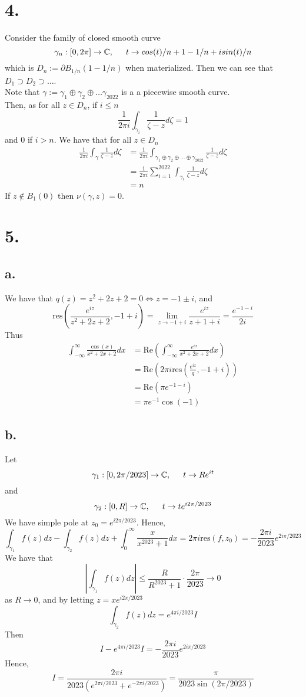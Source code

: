 \documentclass[11pt]{article}
\begin{document}
\section*{4.}
Consider the family of closed smooth curve
\[
    \gamma_n: [0,2\pi] \to \mathbb{C}, \indent t \to cos(t)/n + 1 - 1/n + isin(t)/n
\]
which is $D_n := \partial B_{1/n}(1-1/n)$ when materialized. Then we can see that $D_1 \supset D_2 \supset \hdots$. \\
Note that $\gamma := \gamma_1 \oplus \gamma_2 \oplus \hdots \gamma_{2022}$ is a a piecewise smooth curve.  \\
Then, as for all $z \in D_n$, if $i\le n$
\[
    \frac{1}{2\pi i}\int_{\gamma_i} \frac{1}{\zeta - z} d\zeta = 1 
\]
and $0$ if $i > n$. We have that for all $z \in D_n$
\begin{align*}
    \frac{1}{2\pi i}\int_\gamma \frac{1}{\zeta - z} d\zeta 
    &= \frac{1}{2\pi i}\int_{\gamma_1 \oplus \gamma_2 \oplus \hdots \oplus \gamma_{2022}} \frac{1}{\zeta - z} d\zeta \\
    &= \frac{1}{2\pi i}\sum_{i = 1}^{2022} \int_{\gamma_i} \frac{1}{\zeta - z} d\zeta \\
    &= n
\end{align*}
If $z \notin B_1(0)$ then $\nu(\gamma, z) = 0$. 
\newpage
\section*{5.}
\subsection*{a.}
We have that $q(z) = z^2 + 2z +2 = 0 \iff z = -1 \pm i$, and 
\[
    \text{res}\left(\frac{e^{iz}}{z^2+2z+2}, -1 + i\right) = \lim_{z \to -1+i} \frac{e^{iz}}{z+1+i} = \frac{e^{-1-i}}{2i}
\]
Thus 
\begin{align*}
    \int_{-\infty}^\infty \frac{\cos(x)}{x^2+2x+2} dx 
    &= \text{Re}\left( \int_{-\infty}^\infty \frac{e^{ix}}{x^2+2x+2} dx \right) \\
    &= \text{Re}\left(2\pi i \text{res}\left( \frac{e^{iz}}{q}, -1+i \right) \right)\\
    &= \text{Re}(\pi e^{-1-i}) \\
    &= \pi e^{-1}\cos(-1)
\end{align*}
\subsection*{b.}
Let 
\[
    \gamma_1: [0,2\pi/2023] \to \mathbb{C}, \indent t \to Re^{it}
\]
and 
\[
    \gamma_2: [0, R] \to \mathbb{C}, \indent t \to te^{i2\pi /2023}
\]
We have simple pole at $z_0 = e^{i2\pi /2023}$. Hence, 
\[
    \int_{\gamma_1} f(z)dz - \int_{\gamma_2} f(z) dz + \int_0^\infty \frac{x}{x^{2023} +1} dx =  2\pi i \text{res}(f, z_0) = - \frac{2\pi i}{2023} e^{2i\pi/2023}
\]
We have that 
\[
    \left|\int_{\gamma_1} f(z) dz \right| \le \frac{R}{R^{2023}+1} \cdot \frac{2\pi}{2023} \to 0
\]
as $R \to 0$, and by letting $z = x e^{i2\pi /2023}$
\[
    \int_{\gamma_2} f(z) dz = e^{4\pi i/2023} I
\]
Then 
\[
    I - e^{4\pi i/2023}I = -\frac{2\pi i}{2023} e^{2i \pi/2023}
\]
Hence, 
\[
    I = \frac{2\pi i}{2023(e^{2\pi i/2023} + e^{-2\pi i/2023})} = \frac{\pi}{2023 \sin(2\pi/2023)}
\]
\end{document}
